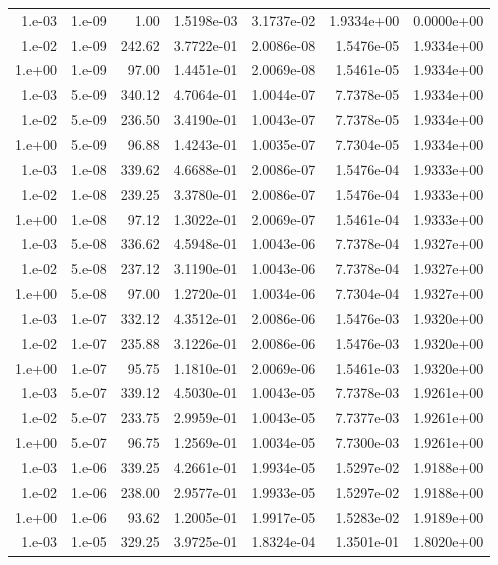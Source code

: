 \begin{table}[htbp]
\begin{tabular}{rrrrrrr}
1.e-03 & 1.e-09 & 1.00 & 1.5198e-03 & 3.1737e-02 & 1.9334e+00 & 0.0000e+00 \\
1.e-02 & 1.e-09 & 242.62 & 3.7722e-01 & 2.0086e-08 & 1.5476e-05 & 1.9334e+00 \\
1.e+00 & 1.e-09 & 97.00 & 1.4451e-01 & 2.0069e-08 & 1.5461e-05 & 1.9334e+00 \\
1.e-03 & 5.e-09 & 340.12 & 4.7064e-01 & 1.0044e-07 & 7.7378e-05 & 1.9334e+00 \\
1.e-02 & 5.e-09 & 236.50 & 3.4190e-01 & 1.0043e-07 & 7.7378e-05 & 1.9334e+00 \\
1.e+00 & 5.e-09 & 96.88 & 1.4243e-01 & 1.0035e-07 & 7.7304e-05 & 1.9334e+00 \\
1.e-03 & 1.e-08 & 339.62 & 4.6688e-01 & 2.0086e-07 & 1.5476e-04 & 1.9333e+00 \\
1.e-02 & 1.e-08 & 239.25 & 3.3780e-01 & 2.0086e-07 & 1.5476e-04 & 1.9333e+00 \\
1.e+00 & 1.e-08 & 97.12 & 1.3022e-01 & 2.0069e-07 & 1.5461e-04 & 1.9333e+00 \\
1.e-03 & 5.e-08 & 336.62 & 4.5948e-01 & 1.0043e-06 & 7.7378e-04 & 1.9327e+00 \\
1.e-02 & 5.e-08 & 237.12 & 3.1190e-01 & 1.0043e-06 & 7.7378e-04 & 1.9327e+00 \\
1.e+00 & 5.e-08 & 97.00 & 1.2720e-01 & 1.0034e-06 & 7.7304e-04 & 1.9327e+00 \\
1.e-03 & 1.e-07 & 332.12 & 4.3512e-01 & 2.0086e-06 & 1.5476e-03 & 1.9320e+00 \\
1.e-02 & 1.e-07 & 235.88 & 3.1226e-01 & 2.0086e-06 & 1.5476e-03 & 1.9320e+00 \\
1.e+00 & 1.e-07 & 95.75 & 1.1810e-01 & 2.0069e-06 & 1.5461e-03 & 1.9320e+00 \\
1.e-03 & 5.e-07 & 339.12 & 4.5030e-01 & 1.0043e-05 & 7.7378e-03 & 1.9261e+00 \\
1.e-02 & 5.e-07 & 233.75 & 2.9959e-01 & 1.0043e-05 & 7.7377e-03 & 1.9261e+00 \\
1.e+00 & 5.e-07 & 96.75 & 1.2569e-01 & 1.0034e-05 & 7.7300e-03 & 1.9261e+00 \\
1.e-03 & 1.e-06 & 339.25 & 4.2661e-01 & 1.9934e-05 & 1.5297e-02 & 1.9188e+00 \\
1.e-02 & 1.e-06 & 238.00 & 2.9577e-01 & 1.9933e-05 & 1.5297e-02 & 1.9188e+00 \\
1.e+00 & 1.e-06 & 93.62 & 1.2005e-01 & 1.9917e-05 & 1.5283e-02 & 1.9189e+00 \\
1.e-03 & 1.e-05 & 329.25 & 3.9725e-01 & 1.8324e-04 & 1.3501e-01 & 1.8020e+00 \\

\end{tabular}
\end{table}
